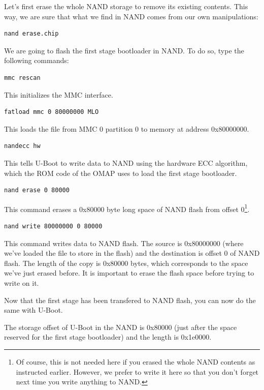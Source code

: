 Let's first erase the whole NAND storage to remove its existing
contents. This way, we are sure that what we find in NAND comes from
our own manipulations:

\begin{verbatim}
nand erase.chip
\end{verbatim}

We are going to flash the first stage bootloader in NAND. To do so,
type the following commands:

\begin{verbatim}
mmc rescan
\end{verbatim}

This initializes the MMC interface.

\begin{verbatim}
fatload mmc 0 80000000 MLO
\end{verbatim}
This loads the file from MMC 0 partition 0 to memory at address
0x80000000.

\begin{verbatim}
nandecc hw
\end{verbatim}

This tells U-Boot to write data to NAND using the hardware ECC
algorithm, which the ROM code of the OMAP uses to load the first stage
bootloader.

\begin{verbatim}
nand erase 0 80000
\end{verbatim}

This command erases a 0x80000 byte long space of NAND flash from
offset 0\footnote{Of course, this is not needed here if you erased the
  whole NAND contents as instructed earlier. However, we prefer to
  write it here so that you don't forget next time you write anything
  to NAND.}.

\begin{verbatim}
nand write 80000000 0 80000
\end{verbatim}

This command writes data to NAND flash. The source is 0x80000000
(where we've loaded the file to store in the flash) and the
destination is offset 0 of NAND flash. The length of the copy is
0x80000 bytes, which corresponds to the space we've just erased
before. It is important to erase the flash space before trying to
write on it.

Now that the first stage has been transfered to NAND flash, you can
now do the same with U-Boot.

The storage offset of U-Boot in the NAND is 0x80000 (just after the
space reserved for the first stage bootloader) and the length is
0x1e0000.

